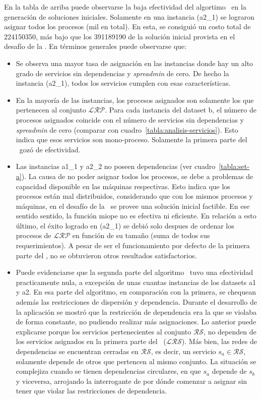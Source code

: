 \documentclass[../informe2.tex]{subfiles}
\begin{document}
\bigskip
\noindent En la tabla de arriba puede observarse la baja efectividad del algortimo \greedy\ en la generación de soluciones iniciales. Solamente en una instancia (a2\_1) se lograron asignar todos los procesos (mil en total). En esta, se consiguió un costo total de 224150350, más bajo que los
391189190 de la solución inicial provista en el desafío de la \roadef. En términos generales puede observarse que:
\begin{itemize}
	\item Se observa una mayor tasa de asignación en las instancias donde hay un alto grado de servicios sin dependencias y \textit{spreadmin} de cero. De hecho la instancia (a2\_1), todos los servicios cumplen con esas características.
	\item En la mayoría de las instancias, los procesos asignados son solamente los que pertenecen al conjunto $\mathcal{LRP}$. Para cada instancia del dataset b, el número de procesos asignados coincide con el número de servicios sin dependencias y \textit{spreadmin} de cero (comparar con cuadro~\ref{tabla:analisis-servicios}). Esto indica que esos servicios son mono-proceso. Solamente la primera parte del \greedy\ gozó de efectividad.
	\item Las instancias a1\_1 y a2\_2 no poseen dependencias (ver cuadro~\ref{tabla:set-a}). La causa de no poder asignar todos los procesos, se debe a problemas de capacidad disponible en las máquinas respectivas. Esto indica que los procesos están mal distribuidos, considerando que con los mismos procesos y máquinas, en el desafío de la \roadef\ se provee una solución inicial factible. En ese sentido sentido, la función miope no es efectiva ni eficiente. En relación a esto último, el éxito logrado en (a2\_1) se debió solo despues de ordenar los procesos de $\mathcal{LRP}$ en función de su tamaño (suma de todos sus requerimientos). A pesar de ser el funcionamiento por defecto de la primera parte del \greedy, no se obtuvieron otros resultados satisfactorios.
	\item Puede evidenciarse que la segunda parte del algoritmo \greedy\ tuvo una efectividad practicamente nula, a excepción de unas cuantas instancias de los datasets a1 y a2. En esa parte del algoritmo, en comparación con la primera, se chequean además las restricciones de dispersión y dependencia. Durante el desarrollo de la aplicación se mostró que la restricción de dependencia era la que se violaba de forma constante, no pudiendo realizar más asignaciones. Lo anterior puede explicarse porque los servicios pertenecientes al conjunto $\mathcal{RS}$, no dependen de los servicios asignados en la primera parte del \greedy\ ($\mathcal{LRS}$). Más bien, las redes de dependencias se encuentran cerradas en $\mathcal{RS}$, es decir, un servicio $s_a \in \mathcal{RS}$, solamente depende de otros que pertencen al mismo conjunto. La situación se complejiza cuando se tienen dependencias circulares, en que $s_a$ depende de $s_b$ y viceversa, arrojando la interrogante de por dónde comenzar a asignar sin tener que violar las restricciones de dependencia.

\end{itemize}
\end{document}
